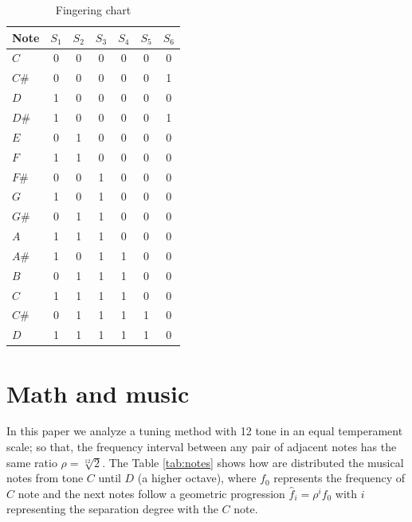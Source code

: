 \documentclass[11pt,twocolumn]{article}
\begin{document}
\begin{table}[h!]
\center
\begin{tabular}{l|c|c|c|c|c|c}
Note & $S_1$ & $S_2$ & $S_3$ & $S_4$ & $S_5$ & $S_6$ \\ \hline
\hline 
$C$  & 0 & 0 & 0 & 0 & 0 & 0 \\
$C\#$& 0 & 0 & 0 & 0 & 0 & 1 \\
$D$  & 1 & 0 & 0 & 0 & 0 & 0 \\
$D\#$& 1 & 0 & 0 & 0 & 0 & 1 \\
$E$  & 0 & 1 & 0 & 0 & 0 & 0 \\
$F$  & 1 & 1 & 0 & 0 & 0 & 0 \\
$F\#$& 0 & 0 & 1 & 0 & 0 & 0 \\
$G$  & 1 & 0 & 1 & 0 & 0 & 0 \\
$G\#$& 0 & 1 & 1 & 0 & 0 & 0 \\
$A$  & 1 & 1 & 1 & 0 & 0 & 0 \\
$A\#$& 1 & 0 & 1 & 1 & 0 & 0 \\
$B$  & 0 & 1 & 1 & 1 & 0 & 0 \\
$C$& 1 & 1 & 1 & 1 & 0 & 0 \\
$C\#$& 0 & 1 & 1 & 1 & 1 & 0 \\
$D$& 1 & 1 & 1 & 1 & 1 & 0 \\
\hline
\end{tabular}
\vspace{5pt}
\caption{Fingering chart}
\label{table:chart}
\end{table}

\section{Math and music}
In this paper we analyze a tuning method with 12 tone in an equal temperament scale; so that, the frequency interval
between any pair of adjacent notes has the same ratio $\rho = {\sqrt[12]{2}}$.
The Table \ref{tab:notes} shows how are distributed the musical notes from tone $C$ until $D$ (a higher octave),
where $f_0$ represents the frequency of $C$ note and the next notes
follow a geometric progression $\hat{f}_{i}={\rho}^i f_{0}$ with $i$ representing the separation degree with the $C$ note. 
\end{document}
